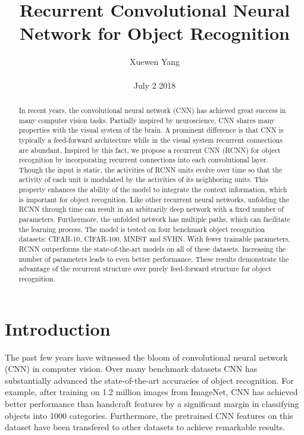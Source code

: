 \documentclass[10pt,twocolumn,letterpaper]{article}
\author{Xuewen Yang\\\\
July 2 2018}
\title{Recurrent Convolutional Neural Network for Object Recognition}
\begin{document}
\maketitle
\begin{abstract}
In recent years, the convolutional neural network (CNN)
has achieved great success in many computer vision tasks.
Partially inspired by neuroscience, CNN shares many properties
with the visual system of the brain. A prominent difference
is that CNN is typically a feed-forward architecture
while in the visual system recurrent connections are abundant.
Inspired by this fact, we propose a recurrent CNN
(RCNN) for object recognition by incorporating recurrent
connections into each convolutional layer. Though the input
is static, the activities of RCNN units evolve over time
so that the activity of each unit is modulated by the activities
of its neighboring units. This property enhances
the ability of the model to integrate the context information,
which is important for object recognition. Like other
recurrent neural networks, unfolding the RCNN through
time can result in an arbitrarily deep network with a fixed
number of parameters. Furthermore, the unfolded network
has multiple paths, which can facilitate the learning process.
The model is tested on four benchmark object recognition
datasets: CIFAR-10, CIFAR-100, MNIST and SVHN.
With fewer trainable parameters, RCNN outperforms the
state-of-the-art models on all of these datasets. Increasing
the number of parameters leads to even better performance.
These results demonstrate the advantage of the recurrent
structure over purely feed-forward structure for object
recognition.
\end{abstract}
\section{Introduction}
The past few years have witnessed the bloom of convolutional neural network (CNN) in computer vision. Over many benchmark datasets CNN has substantially advanced the state-of-the-art accuracies of object recognition\cite{Krizhevsky2012ImageNet}\cite{Chatfield2014Return}\cite{Lin2013Network}. For example, after training on 1.2 million images from ImageNet, CNN has achieved better performance than handcraft features by a significant margin in
classifying objects into 1000 categories. Furthermore, the pretrained CNN features on this dataset have been transfered to other datasets to achieve remarkable results.
\end{document}
